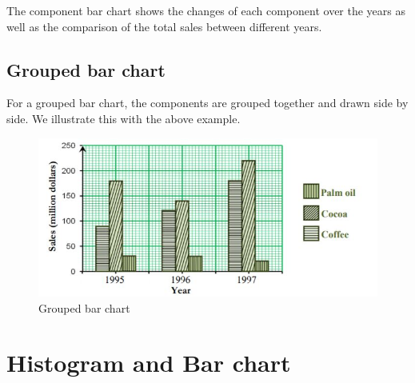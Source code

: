 \documentclass[
]{book}
\begin{document}
The component bar chart shows the changes of each component over the
years as well as the comparison of the total sales between different
years.

\subsection{Grouped bar chart}\label{grouped-bar-chart}

For a grouped bar chart, the components are grouped together and drawn
side by side. We illustrate this with the above example.

\begin{figure}

{\centering \includegraphics[width=0.7\linewidth]{images/image16} 

}

\caption{Grouped bar chart}\label{fig:groupbar}
\end{figure}

\section{Histogram and Bar chart}\label{histogram-and-bar-chart}
\end{document}
